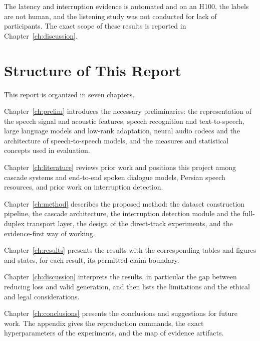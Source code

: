 The latency and interruption evidence is automated and on an H100, the labels are
not human, and the listening study was not conducted for lack of participants. The exact
scope of these results is reported in Chapter~\ref{ch:discussion}.

\section{Structure of This Report}
\label{sec:structure}

This report is organized in seven chapters.

Chapter~\ref{ch:prelim} introduces the necessary preliminaries: the
representation of the speech signal and acoustic features, speech recognition and
text-to-speech, large language models and low-rank adaptation, neural audio
codecs and the architecture of speech-to-speech models, and the measures and
statistical concepts used in evaluation.

Chapter~\ref{ch:literature} reviews prior work and positions this project among
cascade systems and end-to-end spoken dialogue models, Persian speech resources,
and prior work on interruption detection.

Chapter~\ref{ch:method} describes the proposed method: the dataset construction
pipeline, the cascade architecture, the interruption detection module and the
full-duplex transport layer, the design of the direct-track experiments, and the
evidence-first way of working.

Chapter~\ref{ch:results} presents the results with the corresponding tables and
figures and states, for each result, its permitted claim boundary.

Chapter~\ref{ch:discussion} interprets the results, in particular the gap between
reducing loss and valid generation, and then lists the limitations and the
ethical and legal considerations.

Chapter~\ref{ch:conclusions} presents the conclusions and suggestions for future
work. The appendix gives the reproduction commands, the exact hyperparameters of
the experiments, and the map of evidence artifacts.

